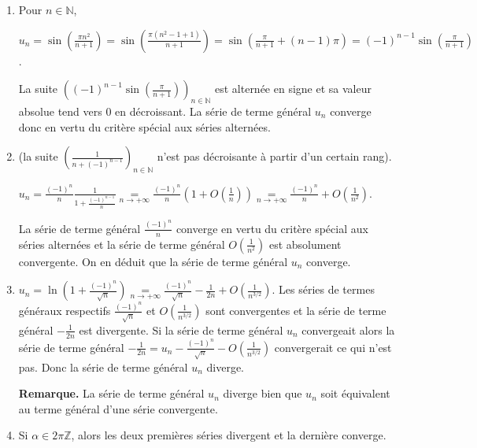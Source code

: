 \documentclass[11pt,a4paper]{article}
\newcommand{\Nn}{\mathbb{N}} \newcommand{\N}{\mathbb{N}}
\newcommand{\Zz}{\mathbb{Z}} \newcommand{\Z}{\mathbb{Z}}
\begin{document}
\begin{enumerate}
 \item  Pour $n\in\Nn$,

\begin{center}
$u_n =\sin\left(\frac{\pi n^2}{n+1}\right)=\sin\left(\frac{\pi(n^2-1+1)}{n+1}\right)=\sin\left(\frac{\pi}{n+1}+(n-1)\pi\right)=(-1)^{n-1}\sin\left(\frac{\pi}{n+1}\right)$.
\end{center}

La suite $\left((-1)^{n-1}\sin\left(\frac{\pi}{n+1}\right)\right)_{n\in\Nn}$ est alternée en signe et sa valeur absolue tend vers 0 en décroissant. La série de terme général $u_n$ converge donc en vertu du critère spécial aux séries alternées.

\item  (la suite $\left(\frac{1}{n+(-1)^{n-1}}\right)_{n\in\Nn}$ n'est pas décroisante à partir d'un certain rang).

\begin{center}
$u_n=\frac{(-1)^n}{n}\frac{1}{1+\frac{(-1)^{n-1}}{n}}\underset{n\rightarrow+\infty}{=}\frac{(-1)^n}{n}\left(1+O\left(\frac{1}{n}\right)\right)\underset{n\rightarrow+\infty}{=}\frac{(-1)^n}{n}+O\left(\frac{1}{n^2}\right)$.
\end{center}

La série de terme général $\frac{(-1)^n}{n}$ converge en vertu du critère spécial aux séries alternées et la série de terme général $O\left(\frac{1}{n^2}\right)$ est absolument convergente. On en déduit que la série de terme général $u_n$ converge.

\item  $u_n=\ln\left(1+\frac{(-1)^n}{\sqrt{n}}\right)\underset{n\rightarrow+\infty}{=}\frac{(-1)^n}{\sqrt{n}}-\frac{1}{2n}+ O\left(\frac{1}{n^{3/2}}\right)$. Les séries de termes généraux respectifs $\frac{(-1)^n}{\sqrt{n}}$  et $O\left(\frac{1}{n^{3/2}}\right)$ sont convergentes et la série de terme général $-\frac{1}{2n}$  est divergente. Si la série de terme général $u_n$ convergeait alors la série de terme général $-\frac{1}{2n}=u_n-\frac{(-1)^n}{\sqrt{n}}-O\left(\frac{1}{n^{3/2}}\right)$ convergerait ce qui n'est pas. Donc la série de terme général $u_n$ diverge.

\textbf{Remarque.} La série de terme général $u_n$ diverge bien que $u_n$ soit équivalent au terme général d'une série convergente.

\item  Si $\alpha\in2\pi\Zz$, alors les deux premières séries divergent et la dernière converge.


\end{enumerate}
\end{document}
